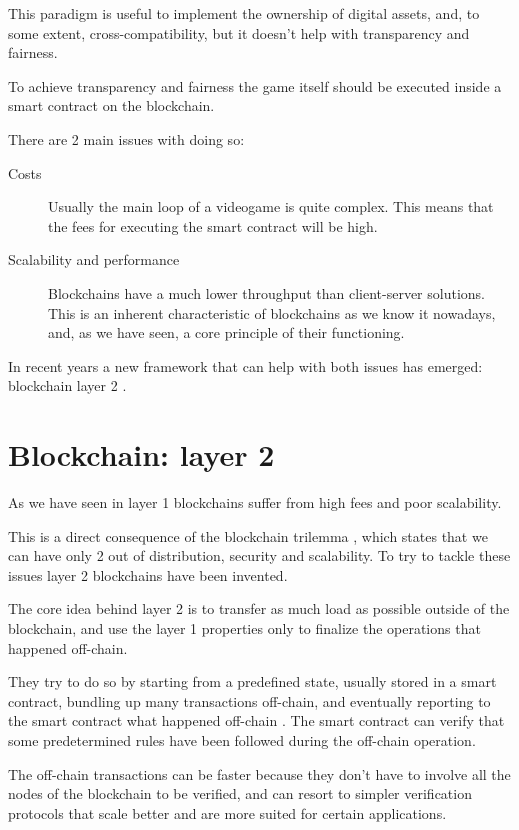 \documentclass[12pt]{article}
\begin{document}
This paradigm is useful to implement the ownership of digital assets, and, to some extent, cross-compatibility, but it doesn't help with transparency and fairness.

To achieve transparency and fairness the game itself should be executed inside a smart contract on the blockchain.

There are 2 main issues with doing so:
\begin{description}
    \item[Costs] Usually the main loop of a videogame is quite complex. This means that the fees for executing the smart contract will be high.
    \item[Scalability and performance] Blockchains have a much lower throughput than client-server solutions. This is an inherent characteristic of blockchains as we know it nowadays, and, as we have seen, a core principle of their functioning.
\end{description}

In recent years a new framework that can help with both issues has emerged: blockchain layer 2 \cite{ethereum_scaling}.

\newpage
\part{Blockchain: layer 2} \label{part:bl2}
As we have seen in  layer 1 blockchains suffer from high fees and poor scalability.

This is a direct consequence of the blockchain trilemma \cite{blockchain_trilemma}, which states that we can have only 2 out of distribution, security and scalability.
To try to tackle these issues layer 2 blockchains have been invented.

The core idea behind layer 2 is to transfer as much load as possible outside of the blockchain, and use the layer 1 properties only to finalize the operations that happened off-chain.

They try to do so by starting from a predefined state, usually stored in a smart contract, bundling up many transactions off-chain, and eventually reporting to the smart contract what happened off-chain \cite{ethereum_layer2}.
The smart contract can verify that some predetermined rules have been followed during the off-chain operation. 

The off-chain transactions can be faster because they don't have to involve all the nodes of the blockchain to be verified, and can resort to simpler verification protocols that scale better and are more suited for certain applications.
\end{document}
